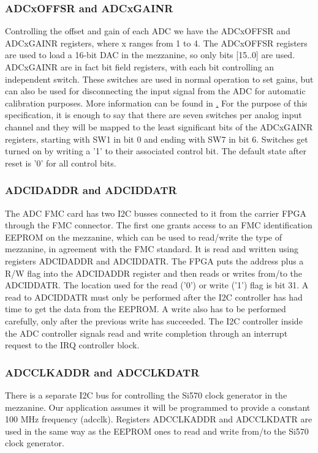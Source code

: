 \documentclass{article}
\begin{document}
\subsubsection{ADCxOFFSR and ADCxGAINR}
\label{sssec:gain_offs}
Controlling the offset and gain of each ADC we have the ADCxOFFSR and ADCxGAINR registers, where x ranges from 1 to 4. The ADCxOFFSR registers are used to load a 16-bit DAC in the mezzanine, so only bits [15..0] are used. ADCxGAINR are in fact bit field registers, with each bit controlling an independent switch. These switches are used in normal operation to set gains, but can also be used for disconnecting the input signal from the ADC for automatic calibration purposes. More information can be found in \href{http://www.ohwr.org/projects/fmc-adc-100m14b4cha}. For the purpose of this specification, it is enough to say that there are seven switches per analog input channel and they will be mapped to the least significant bits of the ADCxGAINR registers, starting with SW1 in bit 0 and ending with SW7 in bit 6. Switches get turned on by writing a '1' to their associated control bit. The default state after reset is '0' for all control bits.

\subsubsection{ADCIDADDR and ADCIDDATR}
The ADC FMC card has two I2C busses connected to it from the carrier FPGA through the FMC connector. The first one grants access to an FMC identification EEPROM on the mezzanine, which can be used to read/write the type of mezzanine, in agreement with the FMC standard. It is read and written using registers ADCIDADDR and ADCIDDATR. The FPGA puts the address plus a R/W flag into the ADCIDADDR register and then reads or writes from/to the ADCIDDATR. The location used for the read ('0') or write ('1') flag is bit 31. A read to ADCIDDATR must only be performed after the I2C controller has had time to get the data from the EEPROM. A write also has to be performed carefully, only after the previous write has succeeded. The I2C controller inside the ADC controller signals read and write completion through an interrupt request to the IRQ controller block. 

\subsubsection{ADCCLKADDR and ADCCLKDATR}
\label{ss:adcclk}
There is a separate I2C bus for controlling the Si570 clock generator in the mezzanine. Our application assumes it will be programmed to provide a constant 100 MHz frequency (adcclk). Registers ADCCLKADDR and ADCCLKDATR are used in the same way as the EEPROM ones to read and write from/to the Si570 clock generator. 
\end{document}
